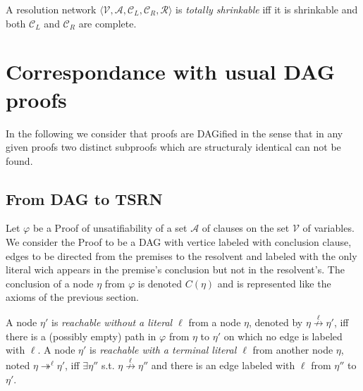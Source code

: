 \documentclass{article}
\newcommand{\varSet}{\mathcal{V}}
\newcommand{\axiomSet}{\mathcal{A}}
\newcommand{\conSet}{\mathcal{C}}
\newcommand{\resoSet}{\mathcal{R}}
\newcommand{\Proof}{\varphi}
\newcommand{\node}{\eta}
\newcommand{\pConclusion}[1]{C\left(#1\right)} %
\newcommand{\nreach}[3]{#1 \overset{#2}{\nrightarrow} #3}
\newcommand{\treach}[3]{#1 \twoheadrightarrow^{#2} #3}
\begin{document}
A resolution network $\langle \varSet, \axiomSet, \conSet_L, \conSet_R, \resoSet \rangle$ is
\emph{totally shrinkable} iff it is shrinkable and both $\conSet_L$ and $\conSet_R$ are complete.





\section{Correspondance with usual DAG proofs}

In the following we consider that proofs are DAGified in the sense that in any given proofs two
distinct subproofs which are structuraly identical can not be found.



\subsection{From DAG to TSRN}

Let $\Proof$ be a Proof of unsatifiability of a set $\axiomSet$ of clauses on the set $\varSet$ of
variables. We consider the Proof to be a DAG with vertice labeled with conclusion clause, edges to
be directed from the premises to the resolvent and labeled with the only literal wich appears in the
premise's conclusion but not in the resolvent's. The conclusion of a node $\node$ from $\Proof$ is
denoted $\pConclusion{\node}$ and is represented like the axioms of the previous section.

A node $\node'$ is \emph{reachable without a literal $\ell$} from a node $\node$, denoted by
$\nreach{\node}{\ell}{\node'}$, iff there is a (possibly empty) path in $\Proof$ from $\node$ to
$\node'$ on which no edge is labeled with $\ell$.
A node $\node'$ is \emph{reachable with a terminal literal $\ell$} from another node $\node$, noted
$\treach{\node}{\ell}{\node'}$, iff $\exists \node''$ s.t. $\nreach{\node}{\ell}{\node''}$ and there
is an edge labeled with $\ell$ from $\node''$ to $\node'$.
\end{document}
